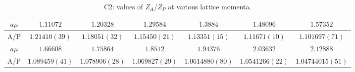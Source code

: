 \begin{table}[h!]
\begin{center}
\caption{C2: values of $Z_A/Z_P$ at various lattice momenta.}
\begin{tabular}{c|c c c c c c}
\hline
\hline
$a\mu$ & $1.11072$ & $1.20328$ & $1.29584$ & $1.3884$ & $1.48096$ & $1.57352$ \\
\hline
A/P & $1.21410(39)$ & $1.18051(32)$ & $1.15450(21)$ & $1.13351(15)$ & $1.11671(10)$ & $1.101697(71)$ \\
\hline
$a\mu$ & $1.66608$ & $1.75864$ & $1.8512$ & $1.94376$ & $2.03632$ & $2.12888$ \\
\hline
A/P & $1.089459(41)$ & $1.078906(28)$ & $1.069827(29)$ & $1.0614880(80)$ & $1.0541266(22)$ & $1.04744015(51)$ \\
\hline
\hline
\end{tabular}
\end{center}
\end{table}